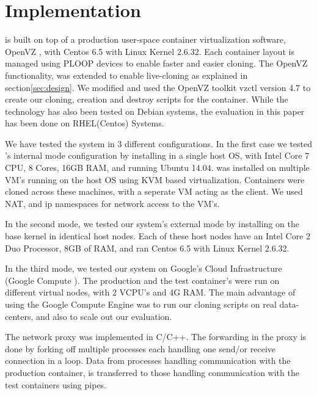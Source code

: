 
\section{Implementation}
\label{sec:implementation}

\parikshan is built on top of a production user-space container virtualization software, OpenVZ \cite{openvz}, with Centos 6.5 with Linux Kernel 2.6.32.
Each container layout is managed using PLOOP\cite{ploop} devices to enable faster and easier cloning.
The OpenVZ functionality, was extended to enable live-cloning as explained in section\ref{sec:design}.
We modified and used the OpenVZ toolkit vzctl version 4.7 to create our cloning, creation and destroy scripts for the container. 
While the technology has also been tested on Debian systems, the evaluation in this paper has been done on RHEL(Centos) Systems. 

We have tested the system in 3 different configurations. 
In the first case we tested \parikshan 's internal mode configuration by installing \parikshan in a single host OS, with Intel Core 7 CPU, 8 Cores, 16GB RAM, and running Ubuntu 14.04. 
\parikshan was installed on multiple VM's running on the host OS using KVM based virtualization. 
Containers were cloned across these machines, with a seperate VM acting as the client.
We used NAT, and ip namespaces for network access to the VM's.

In the second mode, we tested our system's external mode by installing \parikshan on the base kernel in identical host nodes. 
Each of these host nodes have an Intel Core 2 Duo Processor, 8GB of RAM, and ran Centos 6.5 with Linux Kernel 2.6.32.

In the third mode, we tested our system on Google's Cloud Infrastructure (Google Compute \cite{gcompute}).
The production and the test container's were run on different virtual nodes, with 2 VCPU's and 4G RAM. 
The main advantage of using the Google Compute Engine was to run our cloning scripts on real data-centers, and also to scale out our evaluation. 

The network proxy was implemented in C/C++.
The forwarding in the proxy is done by forking off multiple processes each handling one send/or receive connection in a loop.
Data from processes handling communication with the production container, is  transferred to those handling communication with the test containers using pipes. 